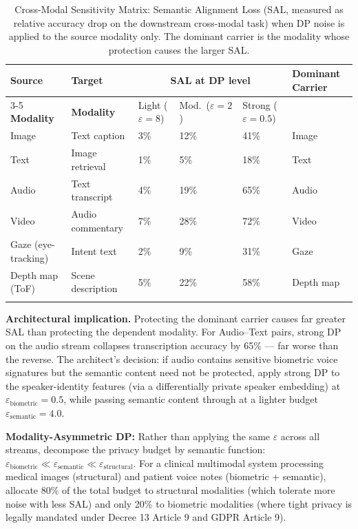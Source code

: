 \begin{table}[ht]
\centering
\caption{Cross-Modal Sensitivity Matrix: Semantic Alignment Loss (SAL, measured as relative accuracy drop on the downstream cross-modal task) when DP noise is applied to the source modality only. The dominant carrier is the modality whose protection causes the larger SAL.}
\label{tab:cross_modal_sensitivity}
\renewcommand{\arraystretch}{1.3}
\begin{tabular}{p{1.9cm} p{2.0cm} p{1.5cm} p{1.8cm} p{1.8cm} p{2.5cm}}
\hline\noalign{\smallskip}
\textbf{Source} & \textbf{Target} & \multicolumn{3}{c}{\textbf{SAL at DP level}} & \textbf{Dominant Carrier} \\
\cline{3-5}
\textbf{Modality} & \textbf{Modality} & Light ($\varepsilon{=}8$) & Mod.\ ($\varepsilon{=}2$) & Strong ($\varepsilon{=}0.5$) & \\
\noalign{\smallskip}\svhline\noalign{\smallskip}
Image & Text caption & 3\% & 12\% & 41\% & Image \\[3pt]
Text & Image retrieval & 1\% & 5\% & 18\% & Text \\[3pt]
Audio & Text transcript & 4\% & 19\% & 65\% & Audio \\[3pt]
Video & Audio commentary & 7\% & 28\% & 72\% & Video \\[3pt]
Gaze (eye-tracking) & Intent text & 2\% & 9\% & 31\% & Gaze \\[3pt]
Depth map (ToF) & Scene description & 5\% & 22\% & 58\% & Depth map \\
\noalign{\smallskip}\hline\noalign{\smallskip}
\end{tabular}
\end{table}

\textbf{Architectural implication.} Protecting the dominant carrier causes far greater SAL than protecting the dependent modality. For Audio--Text pairs, strong DP on the audio stream collapses transcription accuracy by 65\% --- far worse than the reverse. The architect's decision: if audio contains sensitive biometric voice signatures but the semantic content need not be protected, apply strong DP to the speaker-identity features (via a differentially private speaker embedding) at $\varepsilon_{\text{biometric}} = 0.5$, while passing semantic content through at a lighter budget $\varepsilon_{\text{semantic}} = 4.0$.

\begin{svgraybox}
\textbf{Modality-Asymmetric DP:} Rather than applying the same $\varepsilon$ across all streams, decompose the privacy budget by semantic function: $\varepsilon_{\text{biometric}} \ll \varepsilon_{\text{semantic}} \ll \varepsilon_{\text{structural}}$. For a clinical multimodal system processing medical images (structural) and patient voice notes (biometric + semantic), allocate 80\% of the total budget to structural modalities (which tolerate more noise with less SAL) and only 20\% to biometric modalities (where tight privacy is legally mandated under Decree 13 Article 9 and GDPR Article 9).
\end{svgraybox}

